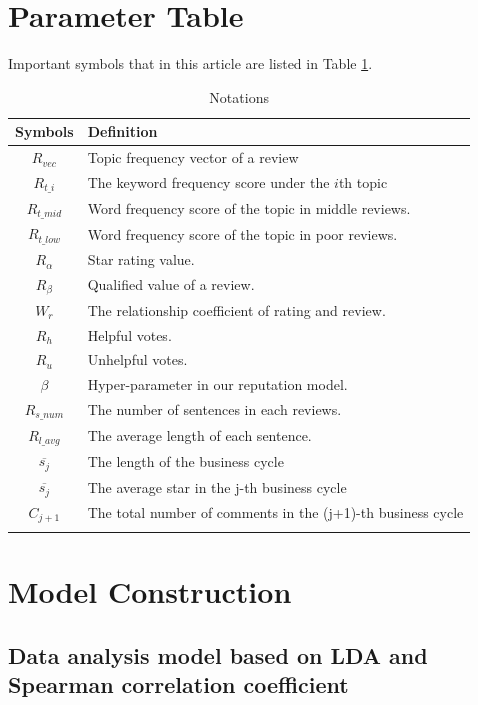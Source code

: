 \documentclass{mcmthesis}
\begin{document}
\section{Parameter Table}

Important symbols that in this article are listed in Table \ref{notation}.
\begin{table}[H] 
	\caption{Notations} 
	\center
	\begin{tabular}{cp{}}
		\toprule 
		Symbols &Definition  \\ 
		\midrule 
		$R_{vec}$& Topic frequency vector of a review  \\ 
		$R_{t\_i}$ & The keyword frequency score under the $i$th topic \\ 
		$R_{t\_{mid}}$ & Word frequency score of the topic in middle reviews. \\ 
		$R_{t\_{low}}$ & Word frequency score of the topic in poor reviews.\\
		$R_{\alpha}$ & Star rating value.\\
		$R_{\beta}$ & Qualified value of a review.\\
		$W_{r}$  & The relationship coefficient of rating and review.\\
		$R_{h}$ & Helpful votes.\\
		$R_{u}$ & Unhelpful votes.\\
		$\beta$ & Hyper-parameter in our reputation model.\\
		$R_{s\_{num}}$ & The number of sentences in each reviews.\\
		$R_{l\_{avg}}$ & The average length of each sentence.\\
		$\overline{s_j}$ &The length of the business cycle\\
		$\overline{s_j}$ &The average star in the j-th business cycle\\
		$C_{j+1}$	&The total number of comments in the (j+1)-th business cycle \\
		\bottomrule 
		\label{notation}
	\end{tabular} 
\end{table}

\section{Model Construction}
\subsection{Data analysis model based on LDA and Spearman correlation coefficient}
\end{document}
